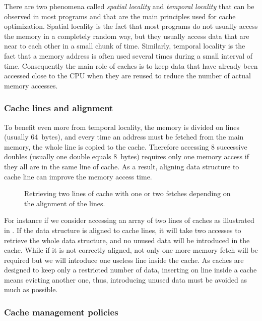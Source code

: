 There are two phenomena called \emph{spatial locality} and \emph{temporal locality} that can be observed in most programs and that are the main principles used for cache optimization.
Spatial locality is the fact that most programs do not usually access the memory in a completely random way, but they usually access data that are near to each other in a small chunk of time.
Similarly, temporal locality is the fact that a memory address is often used several times during a small interval of time.
Consequently the main role of caches is to keep data that have already been accessed close to the \gls{CPU} when they are reused to reduce the number of actual memory accesses.

\subsubsection{Cache lines and alignment}

To benefit even more from temporal locality, the memory is divided on lines (usually \SI{64}{bytes}), and every time an address must be fetched from the main memory, the whole line is copied to the cache.
Therefore accessing $8$ successive doubles (usually one double equals \SI{8}{bytes}) requires only one memory access if they all are in the same line of cache.
As a result, aligning data structure to cache line can improve the memory access time.

\begin{figure}[htb]
    \centering
    
    \caption[Example of bad alignment.]{Retrieving two lines of cache with one or two fetches depending on the alignment of the lines.}
    \label{fig:bad-align}
\end{figure}

For instance if we consider accessing an array of two lines of caches as illustrated in .
If the data structure is aligned to cache lines, it will take two accesses to retrieve the whole data structure, and no unused data will be introduced in the cache.
While if it is not correctly aligned, not only one more memory fetch will be required but we will introduce one useless line inside the cache.
As caches are designed to keep only a restricted number of data, inserting on line inside a cache means evicting another one, thus, introducing unused data must be avoided as much as possible.

\subsubsection{Cache management policies}

